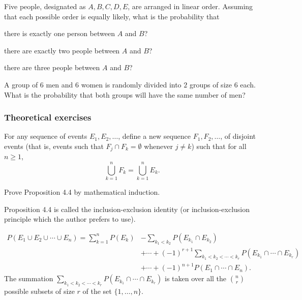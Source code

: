 \begin{problem}[Ross, \S 2, \# 44]
  Five people, designated as \(A,B,C,D,E\), are arranged in linear
  order. Assuming that each possible order is equally likely, what is the
  probability that
  \begin{alphlist}
  \item there is exactly one person between \(A\) and \(B\)?
  \item there are exactly two people between \(A\) and \(B\)?
  \item there are three people between \(A\) and \(B\)?
  \end{alphlist}
\end{problem}
\begin{solution*}
\end{solution*}

\begin{problem}[Ross, \S 2, \# 49]
  A group of \(6\) men and \(6\) women is randomly divided into \(2\)
  groups of size \(6\) each. What is the probability that both groups will
  have the same number of men?
\end{problem}
\begin{solution*}
\end{solution*}

\subsubsection{Theoretical exercises}
\begin{problem}[Ross, \S 2, \# 5]
  For any sequence of events \(E_1,E_2,\dotsc\), define a new sequence
  \(F_1,F_2,\dotsc\), of disjoint events (that is, events such that
  \(F_j\cap F_k=\emptyset\) whenever \(j\neq k\)) such that for all \(n\geq
  1\),
  \[
    \bigcup_{k=1}^n F_k=\bigcup_{k=1}^n E_k.
  \]
\end{problem}
\begin{solution*}
\end{solution*}

\begin{problem}[Ross, \S 2, \# 14]
  Prove Proposition 4.4 by mathematical induction.
\end{problem}
\begin{solution*}
  Proposition 4.4 is called the inclusion-exclusion identity (or
  inclusion-exclusion principle which the author prefers to use).
  \begin{proposition*}
    \[
      \begin{split}
        P(E_1\cup E_2\cup\dotsb\cup E_n)
        =\sum_{k=1}^n P(E_k)&-\sum_{k_1<k_2} P(E_{k_1}\cap E_{k_2})\\
        &+\dotsb+(-1)^{r+1}\sum_{k_1<k_2<\dotsb<k_r}
        P(E_{k_1}\cap\dotsb\cap E_{k_r})\\
        &+\dotsb+(-1)^{n+1}P(E_1\cap\dotsb\cap E_n).
      \end{split}
    \]
    The summation
    \(\sum_{k_1<k_2<\dotsb<k_r}P(E_{k_1}\cap\dotsb\cap E_{k_r})\) is taken
    over all the \(\binom{n}{r}\) possible subsets of size \(r\) of the set
    \(\{1,\dotsc,n\}\).
  \end{proposition*}
\end{solution*}

